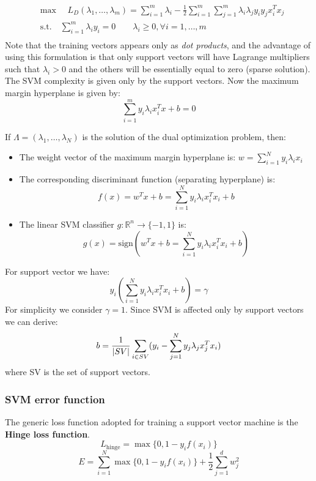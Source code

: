\begin{equation*}
\begin{aligned}
&\text{max }\quad L_D(\lambda_1,\dots,\lambda_m) = \sum_{i = 1}^{m}\lambda_i - \frac{1}{2}\sum_{i = 1}^{m}\sum_{j = 1}^{m}\lambda_i\lambda_jy_iy_jx_i^Tx_j\\
&\text{s.t.} \quad \sum_{i = 1}^{m}\lambda_iy_i= 0 \qquad \lambda_i \geq 0, \forall i = 1,\dots,m\\
\end{aligned}
\end{equation*}
Note that the training vectors appears only as \textit{dot products}, and the advantage of using this formulation is that only support vectors will have Lagrange multipliers such that $\lambda_i > 0$ and the others will be essentially equal to zero (sparse solution). The SVM complexity is given only by the support vectors. Now the maximum margin hyperplane is given by:
$$\sum_{i = 1}^{m} y_i \lambda_ix_i^Tx+b = 0$$

If $\Lambda = (\lambda_1,\dots, \lambda_N)$ is the solution of the dual optimization problem, then:
\begin{itemize}
	\item The weight vector of the maximum margin hyperplane is:
	$w = \sum_{i = 1}^{N} y_i\lambda_ix_i$
	\item The corresponding discriminant function (separating hyperplane) is:
	$$f(x) = w^Tx+b =  \sum_{i = 1}^{N} y_i\lambda_ix_i^Tx_i + b$$
	\item The linear SVM classifier $g: \mathbb{R}^n \rightarrow \{-1,1\}$ is:
	$$g(x) = \text{sign}(w^Tx+b =  \sum_{i = 1}^{N} y_i\lambda_ix_i^Tx_i + b)$$
\end{itemize}
For support vector we have:
$$y_i(\sum_{i = 1}^{N} y_i\lambda_ix_i^Tx_i + b) = \gamma$$
For simplicity we consider $\gamma = 1$. Since SVM is affected only by support vectors we can derive:
$$b = \frac{1}{|SV|}\sum_{i\in SV}\Large(y_i-\sum_{j=1}^{N}y_j\lambda_jx_j^Tx_i\Large)$$
where SV is the set of support vectors.

\subsubsection{SVM error function}
The generic loss function adopted for training a support vector machine is the \textbf{Hinge loss function}. 
$$L_{\text{hinge}} = \max \{0, 1- y_if(x_i)\}$$
$$E = \sum\limits_{i=1}^N\max\{0,1-y_if(x_i)\}+\frac{1}{2}\sum\limits_{j = 1}^dw_j^2$$

